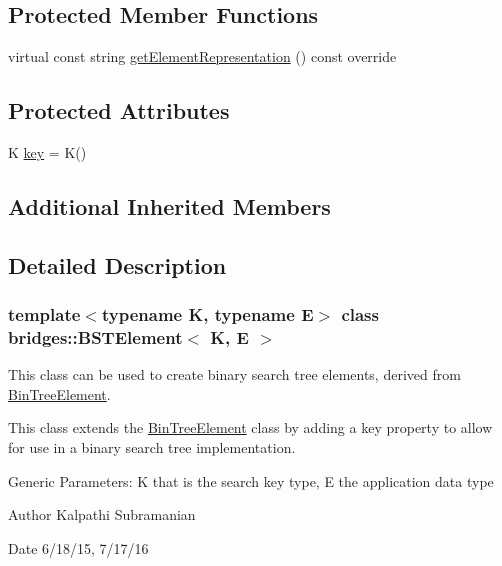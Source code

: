\subsection*{Protected Member Functions}
\begin{DoxyCompactItemize}
\item 
virtual const string \mbox{\hyperlink{classbridges_1_1_b_s_t_element_a623d1495a0d27090dc3fc515d148f381}{get\+Element\+Representation}} () const override
\end{DoxyCompactItemize}
\subsection*{Protected Attributes}
\begin{DoxyCompactItemize}
\item 
K \mbox{\hyperlink{classbridges_1_1_b_s_t_element_aebe8a0958484a0e28e777b423079bae2}{key}} = K()
\end{DoxyCompactItemize}
\subsection*{Additional Inherited Members}


\subsection{Detailed Description}
\subsubsection*{template$<$typename K, typename E$>$\newline
class bridges\+::\+B\+S\+T\+Element$<$ K, E $>$}

This class can be used to create binary search tree elements, derived from \mbox{\hyperlink{classbridges_1_1_bin_tree_element}{Bin\+Tree\+Element}}. 

This class extends the \mbox{\hyperlink{classbridges_1_1_bin_tree_element}{Bin\+Tree\+Element}} class by adding a key property to allow for use in a binary search tree implementation.

Generic Parameters\+: K that is the search key type, E the application data type

\begin{DoxyAuthor}{Author}
Kalpathi Subramanian 
\end{DoxyAuthor}
\begin{DoxyDate}{Date}
6/18/15, 7/17/16 
\end{DoxyDate}


